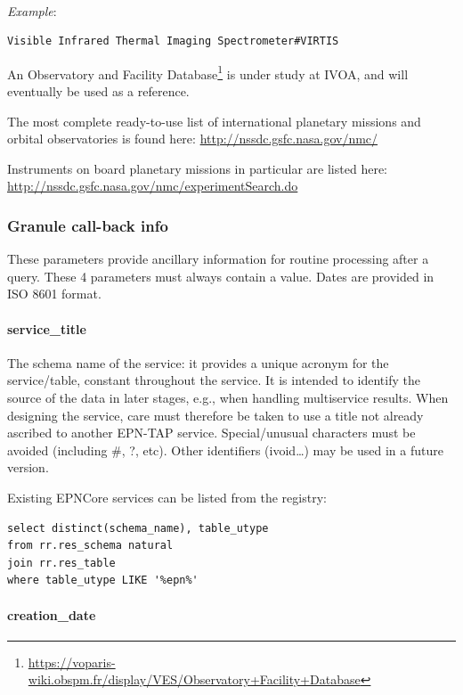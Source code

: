 \documentclass[11pt,a4paper]{ivoa}
\begin{document}
\textbf{\\}
\emph{Example}:

\begin{verbatim}
Visible Infrared Thermal Imaging Spectrometer#VIRTIS
\end{verbatim}

An Observatory and Facility
Database\footnote{\url{https://voparis-wiki.obspm.fr/display/VES/Observatory+Facility+Database}}
is under study at IVOA, and will eventually be used as a reference.


The most complete ready-to-use list of international
planetary missions and orbital observatories is found here:
\url{http://nssdc.gsfc.nasa.gov/nmc/}

Instruments on board planetary missions in particular are listed here:\\
\url{http://nssdc.gsfc.nasa.gov/nmc/experimentSearch.do}

\subsubsection{Granule call-back info}

These parameters provide ancillary information for routine processing
after a query. These 4 parameters must always contain a value.
Dates are provided in ISO 8601 format.

\paragraph{service\_title}

The schema name of the service: it provides a unique acronym for the service/table, constant
throughout the service. It is intended to identify the source of the data in later stages, e.g., when
handling multiservice results. When
designing the service, care must therefore be taken to use a title not
already ascribed to another EPN-TAP service. Special/unusual characters
must be avoided (including \#, ?, etc). Other identifiers (ivoid…) may be used in a future version.

Existing EPNCore services can be listed from the registry:
\begin{verbatim}
select distinct(schema_name), table_utype
from rr.res_schema natural
join rr.res_table
where table_utype LIKE '%epn%'
\end{verbatim}


\paragraph{creation\_date}
\end{document}
